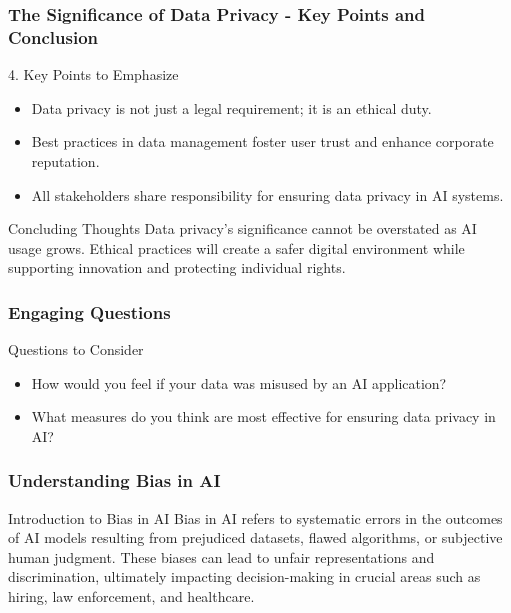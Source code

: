 \documentclass[aspectratio=169]{beamer}
\begin{document}
\begin{frame}[fragile]
    \frametitle{The Significance of Data Privacy - Key Points and Conclusion}
    \begin{block}{4. Key Points to Emphasize}
        \begin{itemize}
            \item Data privacy is not just a legal requirement; it is an ethical duty.
            \item Best practices in data management foster user trust and enhance corporate reputation.
            \item All stakeholders share responsibility for ensuring data privacy in AI systems.
        \end{itemize}
    \end{block}
    
    \begin{block}{Concluding Thoughts}
        Data privacy's significance cannot be overstated as AI usage grows. Ethical practices will create a safer digital environment while supporting innovation and protecting individual rights.
    \end{block}
\end{frame}

\begin{frame}[fragile]
    \frametitle{Engaging Questions}
    \begin{block}{Questions to Consider}
        \begin{itemize}
            \item How would you feel if your data was misused by an AI application?
            \item What measures do you think are most effective for ensuring data privacy in AI?
        \end{itemize}
    \end{block}
\end{frame}

\begin{frame}[fragile]
  \frametitle{Understanding Bias in AI}
  
  \begin{block}{Introduction to Bias in AI}
    Bias in AI refers to systematic errors in the outcomes of AI models resulting from prejudiced datasets, flawed algorithms, or subjective human judgment. 
    These biases can lead to unfair representations and discrimination, ultimately impacting decision-making in crucial areas such as hiring, law enforcement, and healthcare.
  \end{block}
\end{frame}
\end{document}
